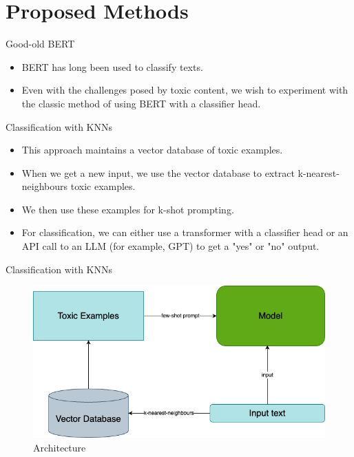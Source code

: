 \section{Proposed Methods}


\begin{frame}{Good-old BERT}

  \begin{itemize}
    \item BERT has long been used to classify texts.
    \item Even with the challenges posed by toxic content, we wish to experiment with the classic method of using BERT with a classifier head.
  \end{itemize}

\end{frame}


\begin{frame}{Classification with KNNs}

  \begin{itemize}
    \item This approach maintains a vector database of toxic examples.
    \item When we get a new input, we use the vector database to extract k-nearest-neighbours toxic examples.
    \item We then use these examples for k-shot prompting.
    \item For classification, we can either use a transformer with a classifier head or an API call to an LLM (for example, GPT) to get a "yes" or "no" output.
  \end{itemize}
    
\end{frame}


\begin{frame}{Classification with KNNs}

  \begin{figure}
    \centering
    \includegraphics[width=0.8\linewidth]{images/architecture.png}
    \caption{Architecture}
  \end{figure}

\end{frame}
